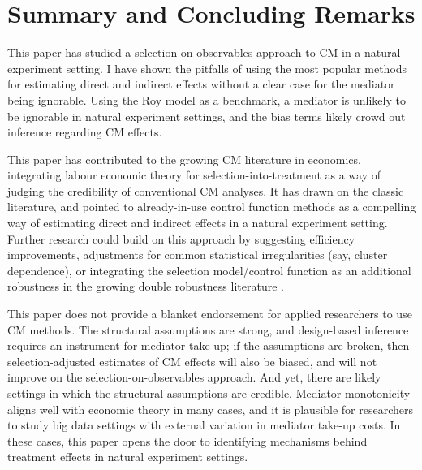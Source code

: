 \section{Summary and Concluding Remarks}
\label{sec:conclusion}

This paper has studied a selection-on-observables approach to CM in a natural experiment setting.
I have shown the pitfalls of using the most popular methods for estimating direct and indirect effects without a clear case for the mediator being ignorable.
Using the Roy model as a benchmark, a mediator is unlikely to be ignorable in natural experiment settings, and the bias terms likely crowd out inference regarding CM effects.

This paper has contributed to the growing CM literature in economics, integrating labour economic theory for selection-into-treatment as a way of judging the credibility of conventional CM analyses.
It has drawn on the classic literature, and pointed to already-in-use control function methods as a compelling way of estimating direct and indirect effects in a natural experiment setting.
Further research could build on this approach by suggesting efficiency improvements, adjustments for common statistical irregularities (say, cluster dependence), or integrating the selection model/control function as an additional robustness in the growing double robustness literature \citep{farbmacher2022causal,bia2024double}.

This paper does not provide a blanket endorsement for applied researchers to use CM methods.
The structural assumptions are strong, and design-based inference requires an instrument for mediator take-up; if the assumptions are broken, then selection-adjusted estimates of CM effects will also be biased, and will not improve on the selection-on-observables approach.
And yet, there are likely settings in which the structural assumptions are credible.
Mediator monotonicity aligns well with economic theory in many cases, and it is plausible for researchers to study big data settings with external variation in mediator take-up costs.
In these cases, this paper opens the door to identifying mechanisms behind treatment effects in natural experiment settings.
